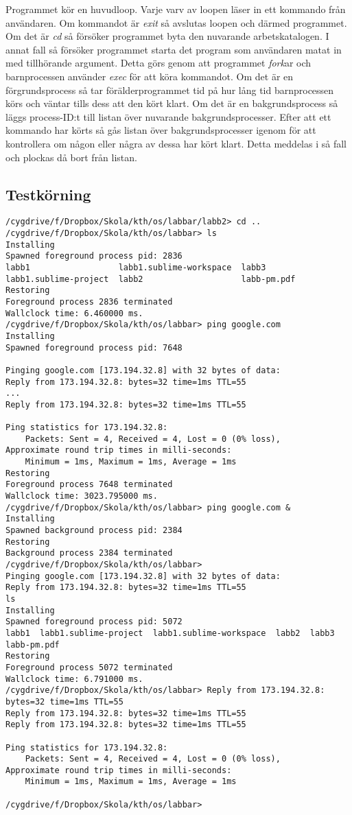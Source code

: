 \documentclass[10pt,a4paper]{article}
\begin{document}
Programmet kör en huvudloop. Varje varv av loopen läser in ett kommando från användaren. Om kommandot är \emph{exit} så avslutas loopen och därmed programmet. Om det är \emph{cd} så försöker programmet byta den nuvarande arbetskatalogen. I annat fall så försöker programmet starta det program som användaren matat in med tillhörande argument. Detta görs genom att programmet \emph{fork}ar och barnprocessen använder \emph{exec} för att köra kommandot. Om det är en förgrundsprocess så tar förälderprogrammet tid på hur lång tid barnprocessen körs och väntar tills dess att den kört klart. Om det är en bakgrundsprocess så läggs process-ID:t till listan över nuvarande bakgrundsprocesser.
Efter att ett kommando har körts så gås listan över bakgrundsprocesser igenom för att kontrollera om någon eller några av dessa har kört klart. Detta meddelas i så fall och plockas då bort från listan.

\clearpage
\subsection{Testkörning}

\begin{lstlisting}
/cygdrive/f/Dropbox/Skola/kth/os/labbar/labb2> cd ..
/cygdrive/f/Dropbox/Skola/kth/os/labbar> ls
Installing
Spawned foreground process pid: 2836
labb1                  labb1.sublime-workspace  labb3
labb1.sublime-project  labb2                    labb-pm.pdf
Restoring
Foreground process 2836 terminated
Wallclock time: 6.460000 ms.
/cygdrive/f/Dropbox/Skola/kth/os/labbar> ping google.com
Installing
Spawned foreground process pid: 7648

Pinging google.com [173.194.32.8] with 32 bytes of data:
Reply from 173.194.32.8: bytes=32 time=1ms TTL=55
...
Reply from 173.194.32.8: bytes=32 time=1ms TTL=55

Ping statistics for 173.194.32.8:
    Packets: Sent = 4, Received = 4, Lost = 0 (0% loss),
Approximate round trip times in milli-seconds:
    Minimum = 1ms, Maximum = 1ms, Average = 1ms
Restoring
Foreground process 7648 terminated
Wallclock time: 3023.795000 ms.
/cygdrive/f/Dropbox/Skola/kth/os/labbar> ping google.com &
Installing
Spawned background process pid: 2384
Restoring
Background process 2384 terminated
/cygdrive/f/Dropbox/Skola/kth/os/labbar>
Pinging google.com [173.194.32.8] with 32 bytes of data:
Reply from 173.194.32.8: bytes=32 time=1ms TTL=55
ls
Installing
Spawned foreground process pid: 5072
labb1  labb1.sublime-project  labb1.sublime-workspace  labb2  labb3  labb-pm.pdf
Restoring
Foreground process 5072 terminated
Wallclock time: 6.791000 ms.
/cygdrive/f/Dropbox/Skola/kth/os/labbar> Reply from 173.194.32.8: bytes=32 time=1ms TTL=55
Reply from 173.194.32.8: bytes=32 time=1ms TTL=55
Reply from 173.194.32.8: bytes=32 time=1ms TTL=55

Ping statistics for 173.194.32.8:
    Packets: Sent = 4, Received = 4, Lost = 0 (0% loss),
Approximate round trip times in milli-seconds:
    Minimum = 1ms, Maximum = 1ms, Average = 1ms

/cygdrive/f/Dropbox/Skola/kth/os/labbar>

\end{lstlisting}
\end{document}
